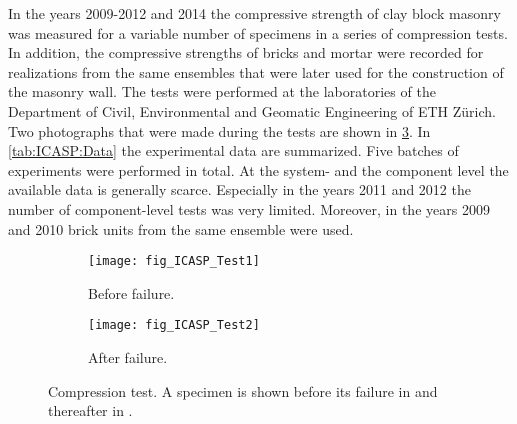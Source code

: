 In the years 2009-2012 and 2014 the compressive strength of clay block masonry was measured for a variable number of specimens in a series of compression tests.
In addition, the compressive strengths of bricks and mortar were recorded for realizations from the same ensembles that were later used for the construction of the masonry wall.
The tests were performed at the laboratories of the Department of Civil, Environmental and Geomatic Engineering of ETH Z\"{u}rich.
Two photographs that were made during the tests are shown in \cref{fig:ICASP:Testing}.
In \cref{tab:ICASP:Data} the experimental data are summarized.
Five batches of experiments were performed in total.
At the system- and the component level the available data is generally scarce.
Especially in the years 2011 and 2012 the number of component-level tests was very limited.
Moreover, in the years 2009 and 2010 brick units from the same ensemble were used.
\begin{figure}[htbp]
  \centering
  \begin{subfigure}[b]{0.49\textwidth}
    \centering
    \texttt{[image: fig\_ICASP\_Test1]}
    \caption[Before failure]{Before failure.}
    \label{fig:ICASP:Testing:1}
  \end{subfigure}\hfill%
  \begin{subfigure}[b]{0.49\textwidth}
    \centering
    \texttt{[image: fig\_ICASP\_Test2]}
    \caption[After failure]{After failure.}
    \label{fig:ICASP:Testing:2}
  \end{subfigure}%
  \caption[Compression test]{Compression test.
          A specimen is shown before its failure in  and thereafter in .
          }
  \label{fig:ICASP:Testing}
\end{figure}
